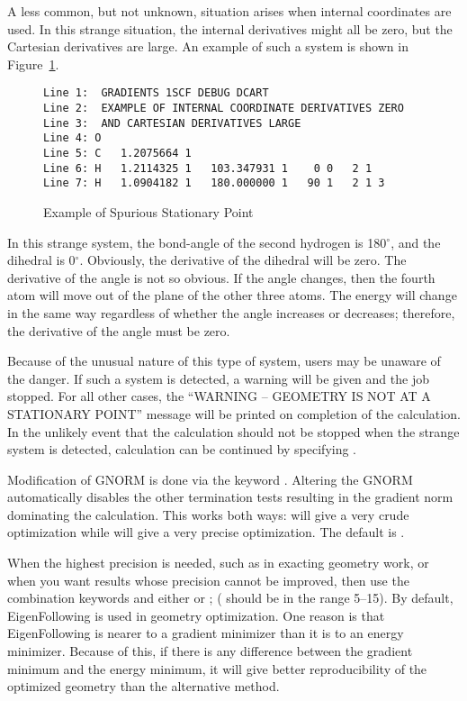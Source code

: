 A less common, but not unknown, situation arises when internal
coordinates are used.  In this strange situation, the internal derivatives might
all be zero, but the Cartesian derivatives are large.  An example of such a
system is shown in Figure~\ref{xch2o}.
\begin{figure}
\begin{makeimage}
\end{makeimage}
\begin{verbatim}
Line 1:  GRADIENTS 1SCF DEBUG DCART
Line 2:  EXAMPLE OF INTERNAL COORDINATE DERIVATIVES ZERO
Line 3:  AND CARTESIAN DERIVATIVES LARGE
Line 4: O
Line 5: C   1.2075664 1
Line 6: H   1.2114325 1   103.347931 1    0 0   2 1
Line 7: H   1.0904182 1   180.000000 1   90 1   2 1 3
\end{verbatim}
\caption{\label{xch2o} Example of Spurious Stationary Point}
\end{figure}

In this strange system, the bond-angle of the second hydrogen is 180$^\circ$,
and the dihedral is 0$^\circ$.  Obviously, the derivative of the dihedral will
be zero. The derivative of the angle is not so obvious.  If the angle changes,
then the fourth atom will move out of the plane of the other three atoms. The
energy will change in the same way regardless of whether the angle increases or
decreases; therefore, the derivative of the angle must be zero.

Because of the unusual nature of this type of system, users may be unaware of
the danger.  If such a system is detected, a warning will be given and the job
stopped.  For all other cases, the ``WARNING -- GEOMETRY IS NOT AT A 
STATIONARY POINT'' message will be printed on completion of the calculation. 
In the unlikely event that the calculation should not be stopped when the
strange system is detected, calculation can be continued by specifying
.

Modification of  GNORM is done via the keyword .  Altering
the   GNORM  automatically disables the other termination tests resulting in
the gradient norm dominating the calculation.  This works both  ways:
  will give a very crude optimization while  
will give a very precise optimization.  The default is .

When the highest precision is needed, such as in exacting  geometry work,  or 
when  you want results whose precision cannot be improved, then use the
combination keywords  and either  or
;   ( should  be  in  the range 
5--15).   By default, EigenFollowing is used in geometry optimization.  One
reason is that EigenFollowing is nearer to a gradient minimizer than it is to
an  energy minimizer.  Because of this, if there is any difference between the
gradient minimum and the energy minimum, it  will give better reproducibility
of the optimized geometry than the alternative  method.

